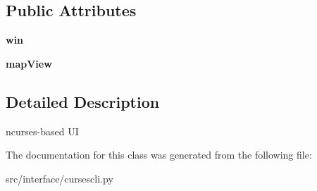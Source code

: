 \subsection*{\-Public \-Attributes}
\begin{DoxyCompactItemize}
\item 
\hypertarget{classinterface_1_1cursescli_1_1_curses_aef928128c6047b9f58b5563951b368c7}{{\bfseries win}}\label{classinterface_1_1cursescli_1_1_curses_aef928128c6047b9f58b5563951b368c7}

\item 
\hypertarget{classinterface_1_1cursescli_1_1_curses_a3489b03044b2c13a4db2ea5ed887b0b3}{{\bfseries map\-View}}\label{classinterface_1_1cursescli_1_1_curses_a3489b03044b2c13a4db2ea5ed887b0b3}

\end{DoxyCompactItemize}


\subsection{\-Detailed \-Description}
\begin{DoxyVerb}ncurses-based UI \end{DoxyVerb}
 

\-The documentation for this class was generated from the following file\-:\begin{DoxyCompactItemize}
\item 
src/interface/cursescli.\-py\end{DoxyCompactItemize}
